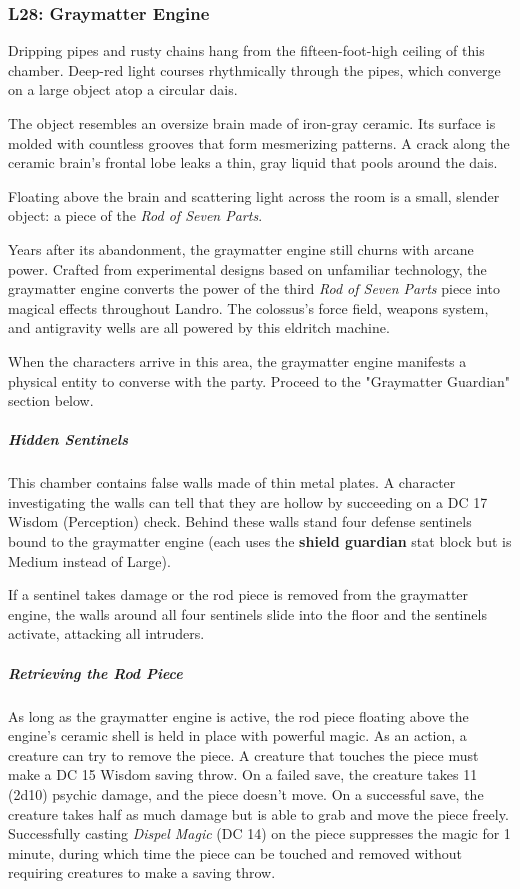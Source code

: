 \documentclass[10pt,a4paper,twoside,bg=print,twocolumn,openany,nodeprecatedcode]{dndbook}
\begin{document}
\subsubsection{L28: Graymatter Engine}
\begin{DndReadAloud}{}
Dripping pipes and rusty chains hang from the fifteen-foot-high ceiling of this chamber. Deep-red light courses rhythmically through the pipes, which converge on a large object atop a circular dais.

The object resembles an oversize brain made of iron-gray ceramic. Its surface is molded with countless grooves that form mesmerizing patterns. A crack along the ceramic brain's frontal lobe leaks a thin, gray liquid that pools around the dais.

Floating above the brain and scattering light across the room is a small, slender object: a piece of the \textit{Rod of Seven Parts}.

\end{DndReadAloud}

Years after its abandonment, the graymatter engine still churns with arcane power. Crafted from experimental designs based on unfamiliar technology, the graymatter engine converts the power of the third \textit{Rod of Seven Parts} piece into magical effects throughout Landro. The colossus's force field, weapons system, and antigravity wells are all powered by this eldritch machine.

When the characters arrive in this area, the graymatter engine manifests a physical entity to converse with the party. Proceed to the "Graymatter Guardian" section below.

\subparagraph{Hidden Sentinels}
This chamber contains false walls made of thin metal plates. A character investigating the walls can tell that they are hollow by succeeding on a DC 17 Wisdom (Perception) check. Behind these walls stand four defense sentinels bound to the graymatter engine (each uses the \textbf{shield guardian} stat block but is Medium instead of Large).

If a sentinel takes damage or the rod piece is removed from the graymatter engine, the walls around all four sentinels slide into the floor and the sentinels activate, attacking all intruders.

\subparagraph{Retrieving the Rod Piece}
As long as the graymatter engine is active, the rod piece floating above the engine's ceramic shell is held in place with powerful magic. As an action, a creature can try to remove the piece. A creature that touches the piece must make a DC 15 Wisdom saving throw. On a failed save, the creature takes 11 (2d10) psychic damage, and the piece doesn't move. On a successful save, the creature takes half as much damage but is able to grab and move the piece freely. Successfully casting \textit{Dispel Magic} (DC 14) on the piece suppresses the magic for 1 minute, during which time the piece can be touched and removed without requiring creatures to make a saving throw.
\end{document}
